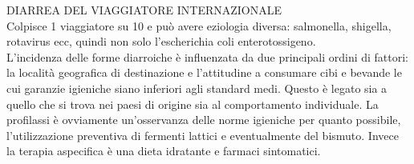 \documentclass[]{article}
\begin{document}
DIARREA DEL VIAGGIATORE INTERNAZIONALE\\
Colpisce 1 viaggiatore su 10 e può avere eziologia diversa: salmonella,
shigella, rotavirus ecc, quindi non solo l'escherichia coli
enterotossigeno.\\
L'incidenza delle forme diarroiche è influenzata da due principali
ordini di fattori: la località geografica di destinazione e l'attitudine
a consumare cibi e bevande le cui garanzie igieniche siano inferiori
agli standard medi. Questo è legato sia a quello che si trova nei paesi
di origine sia al comportamento individuale. La profilassi è ovviamente
un'osservanza delle norme igieniche per quanto possibile,
l'utilizzazione preventiva di fermenti lattici e eventualmente del
bismuto. Invece la terapia aspecifica è una dieta idratante e farmaci
sintomatici.
\end{document}
